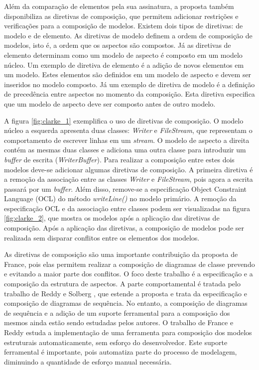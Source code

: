 Além da comparação de elementos pela sua assinatura, a proposta também disponibiliza as diretivas de composição, que permitem adicionar restrições e
verificações para a composição de modelos. Existem dois tipos de diretivas: de modelo e de elemento. As diretivas de modelo definem a ordem de
composição de modelos, isto é, a ordem que os aspectos são compostos. Já as diretivas de elemento determinam como um modelo de aspecto é composto em
um modelo núcleo. Um exemplo de diretiva de elemento é a adição de novos elementos em um modelo. Estes elementos são definidos em um modelo de aspecto
e devem ser inseridos no modelo composto. Já um exemplo de diretiva de modelo é a definição de precedência entre aspectos no momento da composição.
Esta diretiva especifica que um modelo de aspecto deve ser composto antes de outro modelo.

A figura \ref{fig:clarke_1} exemplifica o uso de diretivas de composição. O modelo núcleo a esquerda apresenta duas classes: \textit{Writer} e
\textit{FileStream}, que representam o comportamento de escrever linhas em um \textit{stream}. O modelo de aspecto a direita contém as mesmas duas
classes e adiciona uma outra classe para introduzir um \textit{buffer} de escrita (\textit{WriterBuffer}). Para realizar a composição entre estes dois
modelos deve-se adicionar algumas diretivas de composição. A primeira diretiva é a remoção da associação entre as classes \textit{Writer} e
\textit{FileStream}, pois agora a escrita passará por um \textit{buffer}. Além disso, remove-se a especificação Object Constraint Language (OCL)
\cite{ocl:12} do método \textit{writeLine()} no modelo primário. A remoção da especificação OCL e da associação entre classes podem ser visualizadas
na figura \ref{fig:clarke_2}, que mostra os modelos após a aplicação das diretivas de composição. Após a aplicação das diretivas, a composição de modelos pode ser realizada sem disparar conflitos entre
os elementos dos modelos.

As diretivas de composição são uma importante contribuição da proposta de France, pois elas permitem realizar a composição de diagramas de classe
prevendo e evitando a maior parte dos conflitos. O foco deste trabalho é a especificação e a composição da estrutura de aspectos. A parte
comportamental é tratada pelo trabalho de Reddy e Solberg \cite{ReddySolberg}, que estende a proposta e trata da especificação e composição 
de diagramas de sequência. No entanto, a composição de diagramas de sequência e a adição de um suporte ferramental para a composição dos mesmos ainda estão
sendo estudadas pelos autores. O trabalho de France e Reddy \cite{FranceReddy} estuda a implementação de uma ferramenta para composição dos modelos
estruturais automaticamente, sem esforço do desenvolvedor. Este suporte ferramental é importante, pois automatiza parte do processo de modelagem,
diminuindo a quantidade de esforço manual necessária.

